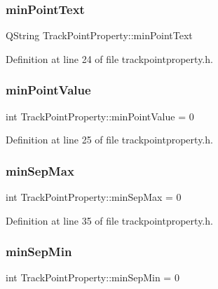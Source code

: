 \subsubsection{\texorpdfstring{minPointText}{minPointText}}
{\footnotesize\ttfamily Q\+String Track\+Point\+Property\+::min\+Point\+Text}



Definition at line 24 of file trackpointproperty.\+h.

\mbox{\label{struct_track_point_property_a7f1e842f8d338d61c7818bb71cbab352}} 
\subsubsection{\texorpdfstring{minPointValue}{minPointValue}}
{\footnotesize\ttfamily int Track\+Point\+Property\+::min\+Point\+Value = 0}



Definition at line 25 of file trackpointproperty.\+h.

\mbox{\label{struct_track_point_property_a0ecb42a8c0289b34a039f647d52c0ead}} 
\subsubsection{\texorpdfstring{minSepMax}{minSepMax}}
{\footnotesize\ttfamily int Track\+Point\+Property\+::min\+Sep\+Max = 0}



Definition at line 35 of file trackpointproperty.\+h.

\mbox{\label{struct_track_point_property_a76a09baff03c25c8b98644a04b622728}} 
\subsubsection{\texorpdfstring{minSepMin}{minSepMin}}
{\footnotesize\ttfamily int Track\+Point\+Property\+::min\+Sep\+Min = 0}



